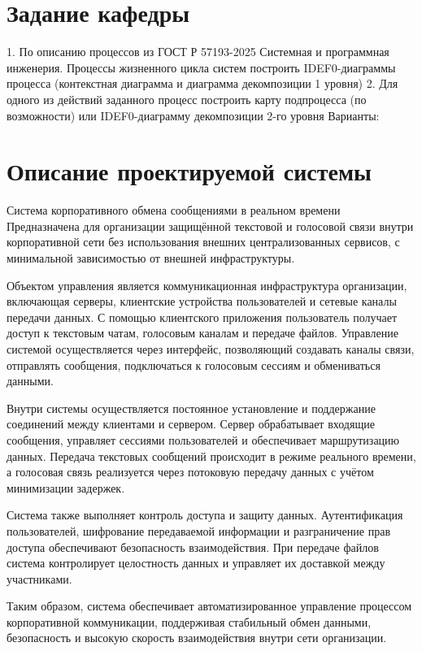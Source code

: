 \documentclass[14pt,a4paper]{extarticle}
\begin{document}
\section{Задание кафедры}
\begin{sloppypar}
    1. По описанию процессов из ГОСТ Р 57193-2025 Системная и программная инженерия. Процессы жизненного цикла систем построить IDEF0-диаграммы процесса (контекстная диаграмма и диаграмма декомпозиции 1 уровня)
    2. Для одного из действий заданного процесс построить карту подпроцесса (по возможности) или IDEF0-диаграмму декомпозиции 2-го уровня
Варианты:
\end{sloppypar}

\section{Описание проектируемой системы}

Система корпоративного обмена сообщениями в реальном времени
Предназначена для организации защищённой текстовой и голосовой связи внутри корпоративной сети без использования внешних централизованных сервисов, с минимальной зависимостью от внешней инфраструктуры.

Объектом управления является коммуникационная инфраструктура организации, включающая серверы, клиентские устройства пользователей и сетевые каналы передачи данных. С помощью клиентского приложения пользователь получает доступ к текстовым чатам, голосовым каналам и передаче файлов. Управление системой осуществляется через интерфейс, позволяющий создавать каналы связи, отправлять сообщения, подключаться к голосовым сессиям и обмениваться данными.

Внутри системы осуществляется постоянное установление и поддержание соединений между клиентами и сервером. Сервер обрабатывает входящие сообщения, управляет сессиями пользователей и обеспечивает маршрутизацию данных. Передача текстовых сообщений происходит в режиме реального времени, а голосовая связь реализуется через потоковую передачу данных с учётом минимизации задержек.

Система также выполняет контроль доступа и защиту данных. Аутентификация пользователей, шифрование передаваемой информации и разграничение прав доступа обеспечивают безопасность взаимодействия. При передаче файлов система контролирует целостность данных и управляет их доставкой между участниками.

Таким образом, система обеспечивает автоматизированное управление процессом корпоративной коммуникации, поддерживая стабильный обмен данными, безопасность и высокую скорость взаимодействия внутри сети организации.
\end{document}
